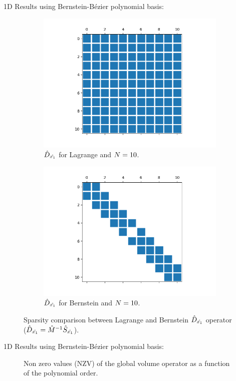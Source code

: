\begin{frame}{1D Results using Bernstein-Bézier polynomial basis:}
\begin{figure}[htbp]
\begin{subfigure}{0.45\textwidth}
\centering
\includegraphics[scale=0.2]{image/dx_lag_10.png}
\caption*{${{\hat{D}}_{\hat{x_1}}}$ for Lagrange and ${N}=10$.}
\end{subfigure}
\begin{subfigure}{0.45\textwidth}
\centering
\includegraphics[scale=0.2]{image/dx_bb_10.png}
\caption*{${{\hat{D}}_{\hat{x_1}}}$ for Bernstein and ${N}=10$.}
\end{subfigure}
\caption*{Sparsity comparison between Lagrange and Bernstein
${{\hat{D}}_{\hat{x_1}}}$ operator (${{\hat{D}}_{\hat{x_1}}} =  {\hat{M}}^{-1} {\hat{S}}_{\hat{x_1}}$).}
\label{dx_sparse_pattern}
\end{figure}
\end{frame}

\begin{frame}[noframenumbering]{1D Results using Bernstein-Bézier polynomial basis:}
\setlength{\plotwidth}{6.0cm}
\setlength{\plotheight}{4.5cm}
\begin{figure}[htbp]
\centering

  \caption*{Non zero values (NZV) of the global volume operator as a function of the polynomial order.}
  \label{bb_lag_comp_1d}
\end{figure}

\end{frame}



